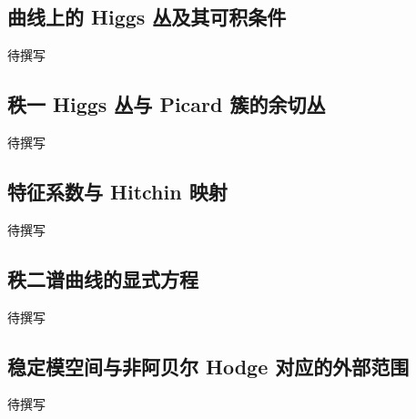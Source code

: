 \subsection{曲线上的 Higgs 丛及其可积条件}
\label{g4:subsec:F04:01}
待撰写

\subsection{秩一 Higgs 丛与 Picard 簇的余切丛}
\label{g4:subsec:F04:02}
待撰写

\subsection{特征系数与 Hitchin 映射}
\label{g4:subsec:F04:03}
待撰写

\subsection{秩二谱曲线的显式方程}
\label{g4:subsec:F04:04}
待撰写

\subsection{稳定模空间与非阿贝尔 Hodge 对应的外部范围}
\label{g4:subsec:F04:05}
待撰写
